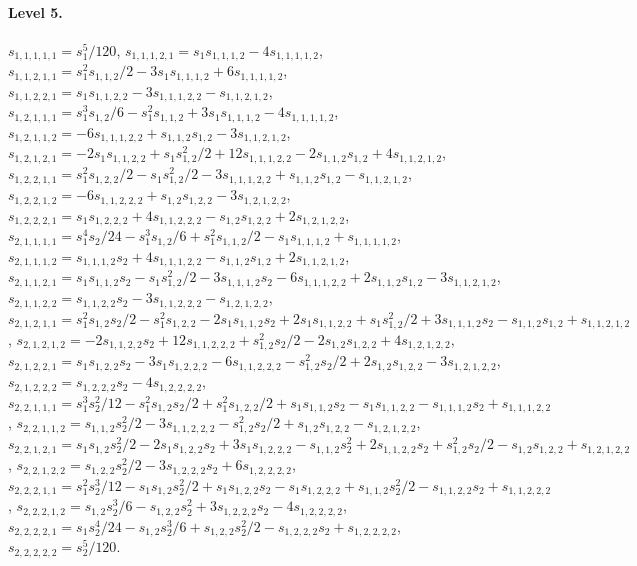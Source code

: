 \documentclass[11pt,english]{article}
\theoremstyle{definition}
\theoremstyle{remark}
\begin{document}
\paragraph{Level 5.}
$s_{1,1,1,1,1}=s_{1}^{5} / 120$,
$s_{1,1,1,2,1}=s_{1} s_{1,1,1,2} - 4 s_{1,1,1,1,2}$,
$s_{1,1,2,1,1}=s_{1}^{2} s_{1,1,2} / 2 - 3 s_{1} s_{1,1,1,2} + 6 s_{1,1,1,1,2}$,
$s_{1,1,2,2,1}=s_{1} s_{1,1,2,2} - 3 s_{1,1,1,2,2} - s_{1,1,2,1,2}$,
$s_{1,2,1,1,1}=s_{1}^{3} s_{1,2} / 6 - s_{1}^{2} s_{1,1,2} + 3 s_{1} s_{1,1,1,2} - 4 s_{1,1,1,1,2}$,
$s_{1,2,1,1,2}=- 6 s_{1,1,1,2,2} + s_{1,1,2} s_{1,2} - 3 s_{1,1,2,1,2}$,
$s_{1,2,1,2,1}=- 2 s_{1} s_{1,1,2,2} + s_{1} s_{1,2}^{2} / 2 + 12 s_{1,1,1,2,2} - 2 s_{1,1,2} s_{1,2} + 4 s_{1,1,2,1,2}$,
$s_{1,2,2,1,1}=s_{1}^{2} s_{1,2,2} / 2 - s_{1} s_{1,2}^{2} / 2 - 3 s_{1,1,1,2,2} + s_{1,1,2} s_{1,2} - s_{1,1,2,1,2}$,
$s_{1,2,2,1,2}=- 6 s_{1,1,2,2,2} + s_{1,2} s_{1,2,2} - 3 s_{1,2,1,2,2}$,
$s_{1,2,2,2,1}=s_{1} s_{1,2,2,2} + 4 s_{1,1,2,2,2} - s_{1,2} s_{1,2,2} + 2 s_{1,2,1,2,2}$,
$s_{2,1,1,1,1}=s_{1}^{4} s_{2} / 24 - s_{1}^{3} s_{1,2} / 6 + s_{1}^{2} s_{1,1,2} / 2 - s_{1} s_{1,1,1,2} + s_{1,1,1,1,2}$,
$s_{2,1,1,1,2}=s_{1,1,1,2} s_{2} + 4 s_{1,1,1,2,2} - s_{1,1,2} s_{1,2} + 2 s_{1,1,2,1,2}$,
$s_{2,1,1,2,1}=s_{1} s_{1,1,2} s_{2} - s_{1} s_{1,2}^{2} / 2 - 3 s_{1,1,1,2} s_{2} - 6 s_{1,1,1,2,2} + 2 s_{1,1,2} s_{1,2} - 3 s_{1,1,2,1,2}$,
$s_{2,1,1,2,2}=s_{1,1,2,2} s_{2} - 3 s_{1,1,2,2,2} - s_{1,2,1,2,2}$,
$s_{2,1,2,1,1}=s_{1}^{2} s_{1,2} s_{2} / 2 - s_{1}^{2} s_{1,2,2} - 2 s_{1} s_{1,1,2} s_{2} + 2 s_{1} s_{1,1,2,2} + s_{1} s_{1,2}^{2} / 2 + 3 s_{1,1,1,2} s_{2} - s_{1,1,2} s_{1,2} + s_{1,1,2,1,2}$,
$s_{2,1,2,1,2}=- 2 s_{1,1,2,2} s_{2} + 12 s_{1,1,2,2,2} + s_{1,2}^{2} s_{2} / 2 - 2 s_{1,2} s_{1,2,2} + 4 s_{1,2,1,2,2}$,
$s_{2,1,2,2,1}=s_{1} s_{1,2,2} s_{2} - 3 s_{1} s_{1,2,2,2} - 6 s_{1,1,2,2,2} - s_{1,2}^{2} s_{2} / 2 + 2 s_{1,2} s_{1,2,2} - 3 s_{1,2,1,2,2}$,
$s_{2,1,2,2,2}=s_{1,2,2,2} s_{2} - 4 s_{1,2,2,2,2}$,
$s_{2,2,1,1,1}=s_{1}^{3} s_{2}^{2} / 12 - s_{1}^{2} s_{1,2} s_{2} / 2 + s_{1}^{2} s_{1,2,2} / 2 + s_{1} s_{1,1,2} s_{2} - s_{1} s_{1,1,2,2} - s_{1,1,1,2} s_{2} + s_{1,1,1,2,2}$,
$s_{2,2,1,1,2}=s_{1,1,2} s_{2}^{2} / 2 - 3 s_{1,1,2,2,2} - s_{1,2}^{2} s_{2} / 2 + s_{1,2} s_{1,2,2} - s_{1,2,1,2,2}$,
$s_{2,2,1,2,1}=s_{1} s_{1,2} s_{2}^{2} / 2 - 2 s_{1} s_{1,2,2} s_{2} + 3 s_{1} s_{1,2,2,2} - s_{1,1,2} s_{2}^{2} + 2 s_{1,1,2,2} s_{2} + s_{1,2}^{2} s_{2} / 2 - s_{1,2} s_{1,2,2} + s_{1,2,1,2,2}$,
$s_{2,2,1,2,2}=s_{1,2,2} s_{2}^{2} / 2 - 3 s_{1,2,2,2} s_{2} + 6 s_{1,2,2,2,2}$,
$s_{2,2,2,1,1}=s_{1}^{2} s_{2}^{3} / 12 - s_{1} s_{1,2} s_{2}^{2} / 2 + s_{1} s_{1,2,2} s_{2} - s_{1} s_{1,2,2,2} + s_{1,1,2} s_{2}^{2} / 2 - s_{1,1,2,2} s_{2} + s_{1,1,2,2,2}$,
$s_{2,2,2,1,2}=s_{1,2} s_{2}^{3} / 6 - s_{1,2,2} s_{2}^{2} + 3 s_{1,2,2,2} s_{2} - 4 s_{1,2,2,2,2}$,
$s_{2,2,2,2,1}=s_{1} s_{2}^{4} / 24 - s_{1,2} s_{2}^{3} / 6 + s_{1,2,2} s_{2}^{2} / 2 - s_{1,2,2,2} s_{2} + s_{1,2,2,2,2}$,
$s_{2,2,2,2,2}=s_{2}^{5} / 120$.
\end{document}
